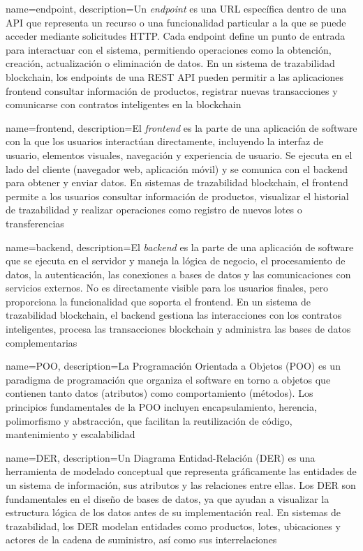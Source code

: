 {
    name=endpoint,
    description={Un \textit{endpoint} es una URL específica dentro de una API que representa un recurso o una funcionalidad particular a la que se puede acceder mediante solicitudes HTTP. Cada endpoint define un punto de entrada para interactuar con el sistema, permitiendo operaciones como la obtención, creación, actualización o eliminación de datos. En un sistema de trazabilidad blockchain, los endpoints de una REST API pueden permitir a las aplicaciones frontend consultar información de productos, registrar nuevas transacciones y comunicarse con contratos inteligentes en la blockchain}
}


{
    name=frontend,
    description={El \textit{frontend} es la parte de una aplicación de software con la que los usuarios interactúan directamente, incluyendo la interfaz de usuario, elementos visuales, navegación y experiencia de usuario. Se ejecuta en el lado del cliente (navegador web, aplicación móvil) y se comunica con el backend para obtener y enviar datos. En sistemas de trazabilidad blockchain, el frontend permite a los usuarios consultar información de productos, visualizar el historial de trazabilidad y realizar operaciones como registro de nuevos lotes o transferencias}
}

{
    name=backend,
    description={El \textit{backend} es la parte de una aplicación de software que se ejecuta en el servidor y maneja la lógica de negocio, el procesamiento de datos, la autenticación, las conexiones a bases de datos y las comunicaciones con servicios externos. No es directamente visible para los usuarios finales, pero proporciona la funcionalidad que soporta el frontend. En un sistema de trazabilidad blockchain, el backend gestiona las interacciones con los contratos inteligentes, procesa las transacciones blockchain y administra las bases de datos complementarias}
}

{
    name=POO,
    description={La Programación Orientada a Objetos (POO) es un paradigma de programación que organiza el software en torno a objetos que contienen tanto datos (atributos) como comportamiento (métodos). Los principios fundamentales de la POO incluyen encapsulamiento, herencia, polimorfismo y abstracción, que facilitan la reutilización de código, mantenimiento y escalabilidad}
}

{
    name=DER,
    description={Un Diagrama Entidad-Relación (DER) es una herramienta de modelado conceptual que representa gráficamente las entidades de un sistema de información, sus atributos y las relaciones entre ellas. Los DER son fundamentales en el diseño de bases de datos, ya que ayudan a visualizar la estructura lógica de los datos antes de su implementación real. En sistemas de trazabilidad, los DER modelan entidades como productos, lotes, ubicaciones y actores de la cadena de suministro, así como sus interrelaciones}
}

